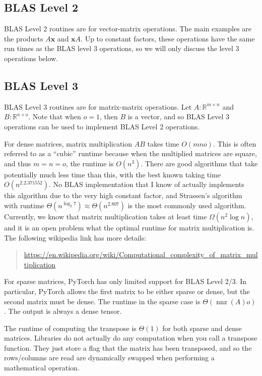 \documentclass[10pt]{article}
\theoremstyle{definition}
\newcommand{\R}{\mathbb R}
\DeclareMathOperator{\nnz}{nnz}
\newcommand{\x}{\mathbf x}
\begin{document}
\newpage
\subsection{BLAS Level 2}

BLAS Level 2 routines are for vector-matrix operations.
The main examples are the products $A\x$ and $\x A$.
Up to constant factors, these operations have the same run times as the BLAS level 3 operations, so we will only discuss the level 3 operations below.

\subsection{BLAS Level 3}

BLAS Level 3 routines are for matrix-matrix operations.
Let $A : \R^{m\times n}$ and $B : \R^{n \times o}$.
Note that when $o=1$, then $B$ is a vector, and so BLAS Level 3 operations can be used to implement BLAS Level 2 operations.

For dense matrices, matrix multiplication $AB$ takes time $O(mno)$.
This is often referred to as a ``cubic'' runtime because when the multiplied matrices are square,
and thus $m=n=o$,
the runtime is $O(n^3)$.
There are good algorithms that take potentially much less time than this,
with the best known taking time $O(n^{2.2.371552})$.
No BLAS implementation that I know of actually implements this algorithm due to the very high constant factor,
and Strassen's algorithm with runtime $\Theta(n^{\log_2 7})\approx\Theta(n^{2.807})$ is the most commonly used algorithm.
Currently, we know that matrix multiplication takes at least time $\Omega(n^2\log n)$,
and it is an open problem what the optimal runtime for matrix multiplication is.
The following wikipedia link has more details:
\begin{quote}
    \url{https://en.wikipedia.org/wiki/Computational_complexity_of_matrix_multiplication}
\end{quote}

For sparse matrices, PyTorch has only limited support for BLAS Level 2/3.
In particular, PyTorch allows the first matrix to be either sparse or dense,
but the second matrix must be dense.
The runtime in the sparse case is $\Theta(\nnz(A)o)$.
The output is always a dense tensor.

The runtime of computing the transpose is $\Theta(1)$
for both sparse and dense matrices.
Libraries do not actually do any computation when you call a transpose function.
They just store a flag that the matrix has been transposed,
and so the rows/columns are read are dynamically swapped when performing a mathematical operation.
\end{document}
